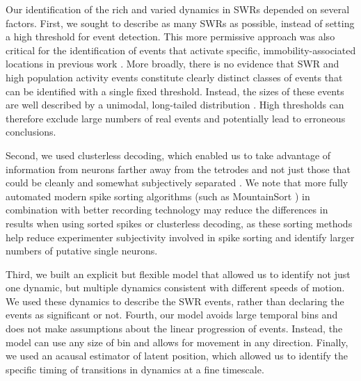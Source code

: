 \documentclass[times, twoside]{zHenriquesLab-StyleBioRxiv}
\begin{document}
Our identification of the rich and varied dynamics in SWRs depended on several factors. First, we sought to describe as many SWRs as possible, instead of setting a high threshold for event detection. This more permissive approach was also critical for the identification of events that activate specific, immobility-associated locations in previous work \cite{JaiDistincthippocampalcorticalmemory2017}. More broadly, there is no evidence that SWR and high population activity events constitute clearly distinct classes of events that can be identified with a single fixed threshold. Instead, the sizes of these events are well described by a unimodal, long-tailed distribution \cite{ChengNewExperiencesEnhance2008}. High thresholds can therefore exclude large numbers of real events and potentially lead to erroneous conclusions. 

Second, we used clusterless decoding, which enabled us to take advantage of information from neurons farther away from the tetrodes and not just those that could be cleanly and somewhat subjectively separated \cite{ChenBayesiannonparametricmethods2016, KloostermanBayesiandecodingusing2014, DengRapidclassificationhippocampal2016}. We note that more fully automated modern spike sorting algorithms (such as MountainSort \cite{ChungFullyAutomatedApproach2017}) in combination with better recording technology may reduce the differences in results when using sorted spikes or clusterless decoding, as these sorting methods help reduce  experimenter subjectivity involved in spike sorting and identify larger numbers of putative single neurons.  

Third, we built an explicit but flexible model that allowed us to identify not just one dynamic, but multiple dynamics consistent with different speeds of motion. We used these dynamics to describe the SWR events, rather than declaring the events as significant or not. Fourth, our model avoids large temporal bins and does not make assumptions about the linear progression of events. Instead, the model can use any size of bin and allows for movement in any direction. Finally, we used an acausal estimator of latent position, which allowed us to identify the specific timing of transitions in dynamics at a fine timescale.
\end{document}
